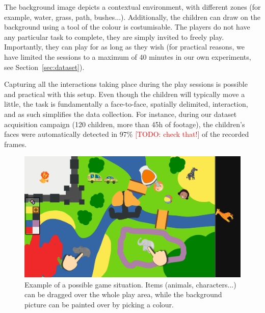 \documentclass[sigconf]{acmart}
\begin{document}
The background image depicts a contextual environment, with different 
zones (for example, water, grass, path, bushes...). Additionally, the children can draw on
the background using a tool of the colour is costumisable. The players do
not have any particular task to complete, they are simply invited to freely
play. Importantly, they can play for as long as they wish (for
practical reasons, we have limited the sessions to a maximum of 40 minutes in
our own experiments, see Section~\ref{sec:dataset}).

Capturing all the interactions taking place during the play sessions is possible
and practical with this setup. Even though the children will typically move a
little, the task is fundamentally a face-to-face, spatially delimited,
interaction, and as such simplifies the data collection. For instance, during
our dataset acquisition campaign (120 children, more than 45h of footage), the
children's faces were automatically detected in 97\% \textcolor{red}{[TODO: check that!]} of the
recorded frames.



\begin{figure}[ht!]
    \centering
    \includegraphics[width=0.9\columnwidth]{sandbox}
    \caption{Example of a possible game situation. Items (animals,
    characters...) can be dragged over the whole play area, while the background
    picture can be painted over by picking a colour.}

    \label{fig|sandbox}
\end{figure}

%
\end{document}
